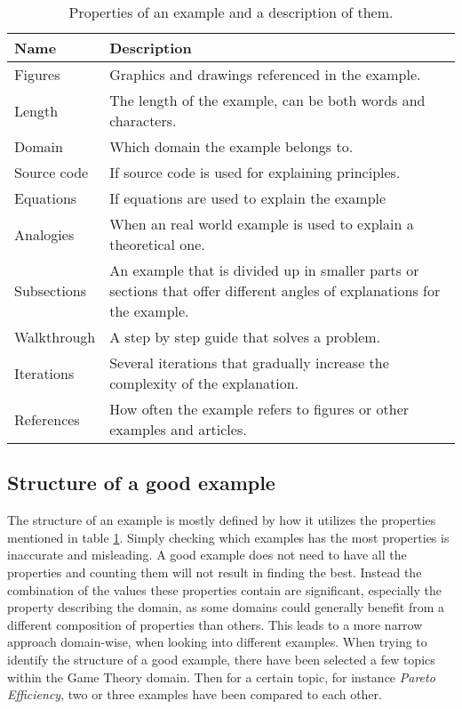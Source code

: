 \begin{table}[h!]
\centering
\begin{tabular} {|| p{5em} | p{23em} ||} 
 \hline
 Name & Description \\ [0.5ex] 
 \hline\hline
 Figures & Graphics and drawings referenced in the example. \\ 
 Length & The length of the example, can be both words and characters. \\
 Domain & Which domain the example belongs to. \\
 Source code & If source code is used for explaining principles. \\
 Equations & If equations are used to explain the example \\
 Analogies & When an real world example is used to explain a theoretical one. \\
 Subsections & An example that is divided up in smaller parts or sections that offer different angles of explanations for the example. \\
 Walkthrough & A step by step guide that solves a problem. \\
 Iterations & Several iterations that gradually increase the complexity of the explanation. \\
 References & How often the example refers to figures or other examples and articles. \\ [1ex] 
 \hline
\end{tabular}
\caption{Properties of an example and a description of them.}
\label{table:1}
\end{table}


\subsection{Structure of a good example} \label{good_example}

The structure of an example is mostly defined by how it utilizes the properties mentioned in table \ref{table:1}. Simply checking which examples has the most properties is inaccurate and misleading. A good example does not need to have all the properties and counting them will not result in finding the best.
Instead the combination of the values these properties contain are significant, especially the property describing the domain, as some domains could generally benefit from a different composition of properties than others. This leads to a more narrow approach domain-wise, when looking into different examples.
When trying to identify the structure of a good example, there have been selected a few topics within the Game Theory domain. Then for a certain topic, for instance \textit{Pareto Efficiency}, two or three examples have been compared to each other.

